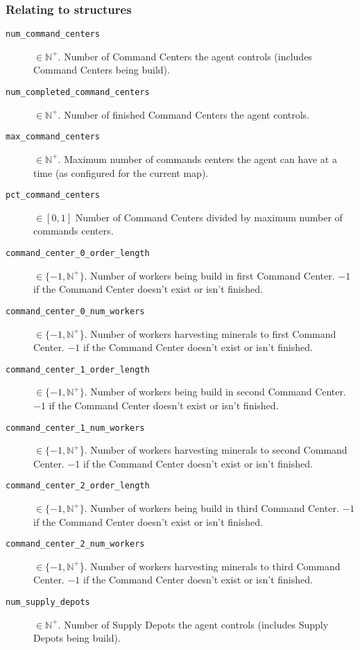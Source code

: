 \subsubsection*{Relating to structures}
\begin{description}
    \item[\texttt{num\_command\_centers}] $\in \mathbb{N}^+$. Number of Command Centers the agent controls (includes Command Centers being build).
    \item[\texttt{num\_completed\_command\_centers}] $\in \mathbb{N}^+$. Number of finished Command Centers the agent controls.
    \item[\texttt{max\_command\_centers}] $\in \mathbb{N}^+$. Maximum number of commands centers the agent can have at a time (as configured for the current map).
    \item[\texttt{pct\_command\_centers}] $\in [0,1]$ Number of Command Centers divided by maximum number of commands centers.
    \item[\texttt{command\_center\_0\_order\_length}] $\in \{-1, \mathbb{N}^+\}$. Number of workers being build in first Command Center. $-1$ if the Command Center doesn't exist or isn't finished.
    \item[\texttt{command\_center\_0\_num\_workers}] $\in \{-1, \mathbb{N}^+$\}. Number of workers harvesting minerals to first Command Center. $-1$ if the Command Center doesn't exist or isn't finished.
    \item[\texttt{command\_center\_1\_order\_length}] $\in \{-1, \mathbb{N}^+\}$. Number of workers being build in second Command Center. $-1$ if the Command Center doesn't exist or isn't finished.
    \item[\texttt{command\_center\_1\_num\_workers}] $\in \{-1, \mathbb{N}^+$\}. Number of workers harvesting minerals to second Command Center. $-1$ if the Command Center doesn't exist or isn't finished.
    \item[\texttt{command\_center\_2\_order\_length}] $\in \{-1, \mathbb{N}^+\}$. Number of workers being build in third Command Center. $-1$ if the Command Center doesn't exist or isn't finished.
    \item[\texttt{command\_center\_2\_num\_workers}] $\in \{-1, \mathbb{N}^+$\}. Number of workers harvesting minerals to third Command Center. $-1$ if the Command Center doesn't exist or isn't finished.
    \item[\texttt{num\_supply\_depots}] $\in \mathbb{N}^+$. Number of Supply Depots the agent controls (includes Supply Depots being build).

\end{description}
